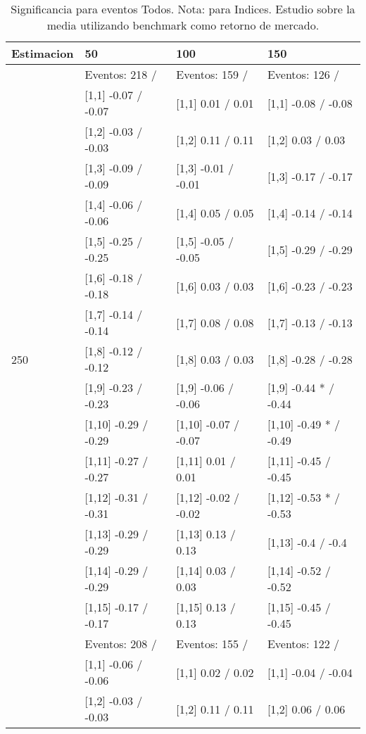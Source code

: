 \begin{table}

\caption{Significancia para eventos Todos. Nota: para Indices. Estudio sobre la media utilizando benchmark como retorno de mercado.}
\centering
\begin{tabular}[t]{llll}
\toprule
Estimacion & 50 & 100 & 150\\
\midrule
 & Eventos:  218 / & Eventos:  159 / & Eventos:  126 /\\
 & {}[1,1] -0.07  / -0.07 & {}[1,1] 0.01  / 0.01 & {}[1,1] -0.08  / -0.08\\
 & {}[1,2] -0.03  / -0.03 & {}[1,2] 0.11  / 0.11 & {}[1,2] 0.03  / 0.03\\
 & {}[1,3] -0.09  / -0.09 & {}[1,3] -0.01  / -0.01 & {}[1,3] -0.17  / -0.17\\
 & {}[1,4] -0.06  / -0.06 & {}[1,4] 0.05  / 0.05 & {}[1,4] -0.14  / -0.14\\
\addlinespace
 & {}[1,5] -0.25  / -0.25 & {}[1,5] -0.05  / -0.05 & {}[1,5] -0.29  / -0.29\\
 & {}[1,6] -0.18  / -0.18 & {}[1,6] 0.03  / 0.03 & {}[1,6] -0.23  / -0.23\\
 & {}[1,7] -0.14  / -0.14 & {}[1,7] 0.08  / 0.08 & {}[1,7] -0.13  / -0.13\\
250 & {}[1,8] -0.12  / -0.12 & {}[1,8] 0.03  / 0.03 & {}[1,8] -0.28  / -0.28\\
 & {}[1,9] -0.23  / -0.23 & {}[1,9] -0.06  / -0.06 & {}[1,9] -0.44 * / -0.44\\
\addlinespace
 & {}[1,10] -0.29  / -0.29 & {}[1,10] -0.07  / -0.07 & {}[1,10] -0.49 * / -0.49\\
 & {}[1,11] -0.27  / -0.27 & {}[1,11] 0.01  / 0.01 & {}[1,11] -0.45  / -0.45\\
 & {}[1,12] -0.31  / -0.31 & {}[1,12] -0.02  / -0.02 & {}[1,12] -0.53 * / -0.53\\
 & {}[1,13] -0.29  / -0.29 & {}[1,13] 0.13  / 0.13 & {}[1,13] -0.4  / -0.4\\
 & {}[1,14] -0.29  / -0.29 & {}[1,14] 0.03  / 0.03 & {}[1,14] -0.52  / -0.52\\
\addlinespace
 & {}[1,15] -0.17  / -0.17 & {}[1,15] 0.13  / 0.13 & {}[1,15] -0.45  / -0.45\\
 & Eventos:  208 / & Eventos:  155 / & Eventos:  122 /\\
 & {}[1,1] -0.06  / -0.06 & {}[1,1] 0.02  / 0.02 & {}[1,1] -0.04  / -0.04\\
 & {}[1,2] -0.03  / -0.03 & {}[1,2] 0.11  / 0.11 & {}[1,2] 0.06  / 0.06\\

\end{tabular}
\end{table}

